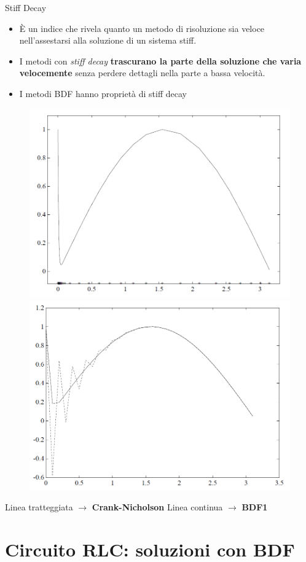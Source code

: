 \documentclass[aspectratio=169, 10pt, handout,usenames,dvipsnames]{beamer}
\begin{document}
    \begin{frame}{Stiff Decay}
        \medskip
        \medskip
        \begin{itemize}
        \item È un \alert{indice} che rivela quanto un metodo di risoluzione sia veloce nell’assestarsi alla soluzione di un sistema stiff.\\
        \item I metodi con \textit{stiff decay} \textbf{trascurano la parte della soluzione che
        varia velocemente} senza perdere dettagli nella parte a bassa velocità.
        \item I metodi BDF hanno proprietà di stiff decay
        \end{itemize}
        \begin{figure}
        \includegraphics[width=.4\linewidth]{fig9.png}
        \includegraphics[width=.4\linewidth]{fig8.png}
        \label{fig:stiff_decay}
    \end{figure}
        \begin{centering}
            Linea tratteggiata $\rightarrow$ \textbf{Crank-Nicholson} \space\space\space Linea continua $\rightarrow$ \textbf{BDF1}\\
        \end{centering}
    \end{frame}

\section{Circuito RLC: soluzioni con BDF}\label{sec:sec12}  
\end{document}
